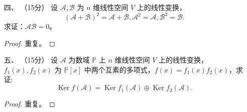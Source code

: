 \begin{enumerate}[1~]
\item[四、]（15分）
设 $\mathscr { A } , \mathscr { B }$ 为 $n$ 维线性空间 $V$ 上的线性变换，\[
( \mathscr { A } + \mathscr { B } ) ^ { 2 } = \mathscr { A } + \mathscr { B } , \mathscr { A } ^ { 2 } = \mathscr { A } , \mathscr { B } ^ { 2 } = \mathscr { B }.
\]
求证：$\mathscr { A }  \mathscr { B }=0$。
\begin{proof}
重复。
\end{proof}

\item[五、]（15分）
 设 $\mathscr{A}$ 为数域 $\mathbb{P}$ 上 $n$ 维线性空间 $V$ 上的线性变换，$f_1(x), f_2(x)$ 为 $\mathbb{P} [x]$ 中两个互素的多项式，$f(x) =
f_1(x)f_2(x)$，求证:\[
\operatorname { Ker } f ( \mathscr { A } ) = \operatorname { Ker } f _ { 1 } ( \mathscr { A } ) \oplus \operatorname { Ker } f _ { 2 } ( \mathscr { A } ).
\]
\begin{proof}
重复。
\end{proof}


\end{enumerate}
